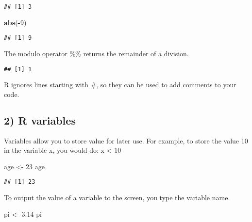 \documentclass[
]{article}
\newenvironment{Shaded}{\begin{snugshade}}{\end{snugshade}}
\newcommand{\DecValTok}[1]{\textcolor[rgb]{0.00,0.00,0.81}{#1}}
\newcommand{\FloatTok}[1]{\textcolor[rgb]{0.00,0.00,0.81}{#1}}
\newcommand{\KeywordTok}[1]{\textcolor[rgb]{0.13,0.29,0.53}{\textbf{#1}}}
\newcommand{\NormalTok}[1]{#1}
\newcommand{\OperatorTok}[1]{\textcolor[rgb]{0.81,0.36,0.00}{\textbf{#1}}}
\newcommand{\StringTok}[1]{\textcolor[rgb]{0.31,0.60,0.02}{#1}}
\begin{document}
\begin{verbatim}
## [1] 3
\end{verbatim}

\begin{Shaded}
\begin{Highlighting}[]
\KeywordTok{abs}\NormalTok{(}\OperatorTok{-}\DecValTok{9}\NormalTok{)}
\end{Highlighting}
\end{Shaded}

\begin{verbatim}
## [1] 9
\end{verbatim}

The modulo operator \%\% returns the remainder of a division.

\begin{Shaded}
\end{Shaded}

\begin{verbatim}
## [1] 1
\end{verbatim}

R ignores lines starting with \#, so they can be used to add comments to
your code.

\hypertarget{r-variables}{%
\subsection{2) R variables}\label{r-variables}}

Variables allow you to store value for later use. For example, to store
the value 10 in the variable x, you would do: x \textless-10

\begin{Shaded}
\begin{Highlighting}[]
\NormalTok{  age <-}\StringTok{ }\DecValTok{23}
\NormalTok{  age}
\end{Highlighting}
\end{Shaded}

\begin{verbatim}
## [1] 23
\end{verbatim}

To output the value of a variable to the screen, you type the variable
name.

\begin{Shaded}
\begin{Highlighting}[]
\NormalTok{  pi <-}\StringTok{ }\FloatTok{3.14}
\NormalTok{  pi}
\end{Highlighting}
\end{Shaded}
\end{document}

